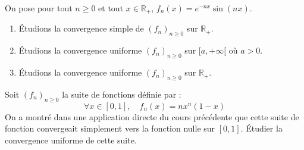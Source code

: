 \documentclass[a4paper,10pt]{report}
\begin{document}
\medskip

\begin{Exemple} On pose pour tout $n \geq 0$ et tout $x \in \mathbb{R}_+$, $f_n(x)= e^{-nx} \sin(nx)$.

\begin{enumerate}
\item Étudions la convergence simple de $(f_n)_{n \geq 0}$ sur $\mathbb{R}_+$. 
%

\vspace{7cm}
\item Étudions la convergence uniforme $(f_n)_{n \geq 0}$ sur $[a, + \infty[$ où $a>0$. 

\vspace{7cm}
%
\item Étudions la convergence uniforme $(f_n)_{n \geq 0}$ sur $\mathbb{R}_+$. 

\vspace{5cm}
\end{enumerate}
\end{Exemple}





\begin{ApplicationDirecte} Soit $(f_n)_{n \geq 0}$ la suite de fonctions définie par :
$$ \forall x \in [0,1], \quad f_n(x) = n x^n(1-x)$$
On a montré dans une application directe du cours précédente que cette suite de fonction convergeait simplement vers la fonction nulle sur $[0,1]$. Étudier la convergence uniforme de cette suite.
\end{ApplicationDirecte} 
\end{document}
